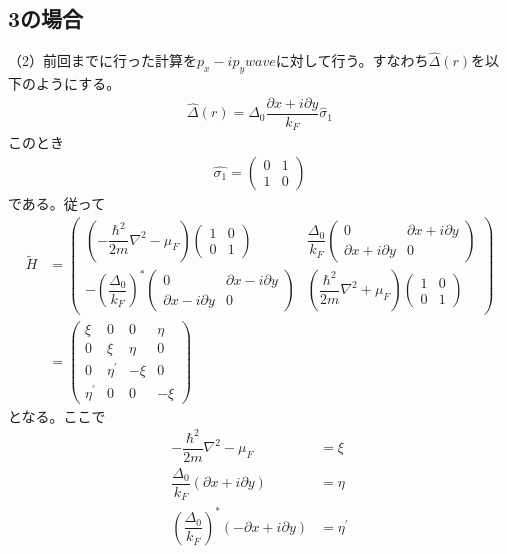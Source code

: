 \documentclass{jarticle}
\begin{document}
\subsection{3の場合}
（2）前回までに行った計算を$p_{x}-ip_{y}wave$に対して行う。すなわち$\hat{\Delta}(r)$を以下のようにする。
\begin{align}
\hat{\Delta}(r)=\Delta_0\dfrac{\partial x+i\partial y}{k_F}\hat\sigma_1
\end{align}
このとき
\begin{align}
\hat{\sigma_1}=
\begin{pmatrix}
0 & 1\\
1 & 0
\end{pmatrix}
\end{align}
である。従って
\begin{align}
\tilde{H}&=
\begin{pmatrix}
(-\dfrac{\hbar^2}{2m}\nabla^2-\mu_F)\begin{pmatrix}
1 & 0 \\
0 & 1
\end{pmatrix} & \dfrac{\Delta_0}{k_{F}} \begin{pmatrix}
0 & \partial x+i\partial y \\
\partial x+i\partial y & 0
\end{pmatrix} \\
-\left(\dfrac{\Delta_0}{k_{F}}\right)^{*}
\begin{pmatrix}
0 & \partial x-i\partial y \\
\partial x-i\partial y& 0
\end{pmatrix} & (\dfrac{\hbar^2}{2m}\nabla^2+\mu_F)\begin{pmatrix}
1 & 0 \\
0 & 1
\end{pmatrix}
\end{pmatrix}
\\&=\begin{pmatrix}
\xi & 0 & 0 & \eta \\ 
0 & \xi & \eta & 0 \\ 
0 & \eta^{'} & -\xi & 0 \\ 
\eta^{'} & 0 & 0 & -\xi
\end{pmatrix} 
\end{align}
となる。ここで
\begin{align}
-\dfrac{\hbar^2}{2m}\nabla^2-\mu_F&=\xi\\
\dfrac{\Delta_0}{k_{F}}(\partial x+i\partial y)&=\eta\\
\left(\dfrac{\Delta_0}{k_{F}}\right)^{*}(-\partial x+i\partial y)&=\eta^{'}
\end{align}
\end{document}

